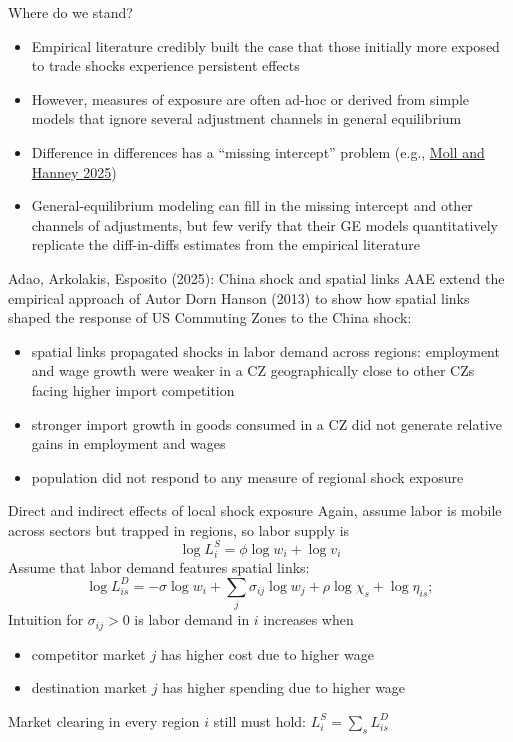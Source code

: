 \documentclass[11pt,notes=hide,aspectratio=169]{beamer}
\begin{document}
\begin{frame}{Where do we stand?}
\begin{itemize}
\item Empirical literature credibly built the case that those initially more exposed to trade shocks experience persistent effects
\item However, measures of exposure are often ad-hoc or derived from simple models that ignore several adjustment channels in general equilibrium
\item Difference in differences has a ``missing intercept'' problem (e.g., \href{https://voxdev.org/topic/methods-measurement/missing-intercept-problem-going-micro-macro}{Moll and Hanney 2025})
\item General-equilibrium modeling can fill in the missing intercept and other channels of adjustments, but few verify that their GE models quantitatively replicate the diff-in-diffs estimates from the empirical literature
\end{itemize}
\end{frame}
\begin{frame}{Adao, Arkolakis, Esposito (2025): China shock and spatial links}
AAE extend the empirical approach of Autor Dorn Hanson (2013) to show how spatial links shaped the response of US Commuting Zones to the China shock:
\begin{itemize}
\item spatial links propagated shocks in labor demand across regions: employment and wage growth were weaker in a CZ geographically close to other CZs facing higher import competition
\item stronger import growth in goods consumed in a CZ did not generate relative gains in employment and wages
\item population did not respond to any measure of regional shock exposure
\end{itemize}
\end{frame}
\begin{frame}{Direct and indirect effects of local shock exposure}
Again, assume labor is mobile across sectors but trapped in regions, so labor supply is
$$ \log L_{i}^{S}=\phi \log w_{i}+\log v_{i} $$
Assume that labor demand features spatial links:
$$ \log L_{is}^{D}=-\sigma \log w_{i}+\sum_{j}\sigma_{ij}\log w_{j}+\rho \log \chi_{s}+\log \eta_{is}; $$
Intuition for $\sigma_{ij}>0$ is labor demand in $i$ increases when
\begin{itemize}
    \item competitor market $j$ has higher cost due to higher wage 
    \item destination market $j$ has higher spending due to higher wage 
\end{itemize}
Market clearing in every region $i$ still must hold: $L_{i}^{S}=\sum_{s}L_{is}^{D}$
\end{frame}
\end{document}

